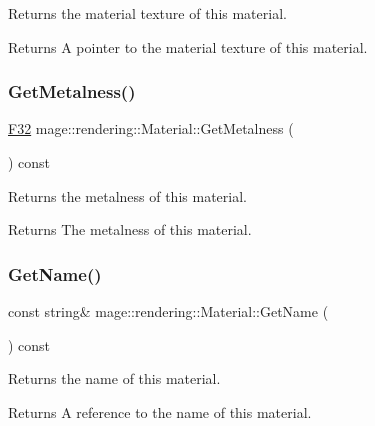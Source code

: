 Returns the material texture of this material.

\begin{DoxyReturn}{Returns}
A pointer to the material texture of this material. 
\end{DoxyReturn}
\hypertarget{classmage_1_1rendering_1_1_material_aaa4265533437b462e2f2087cfa37e623}{}\label{classmage_1_1rendering_1_1_material_aaa4265533437b462e2f2087cfa37e623} 
\subsubsection{\texorpdfstring{Get\+Metalness()}{GetMetalness()}}
{\footnotesize\ttfamily \hyperlink{namespacemage_aa97e833b45f06d60a0a9c4fc22ae02c0}{F32} mage\+::rendering\+::\+Material\+::\+Get\+Metalness (\begin{DoxyParamCaption}{ }\end{DoxyParamCaption}) const\hspace{0.3cm}{\ttfamily [noexcept]}}

Returns the metalness of this material.

\begin{DoxyReturn}{Returns}
The metalness of this material. 
\end{DoxyReturn}
\hypertarget{classmage_1_1rendering_1_1_material_ab94089dbe7d1b242fad455e9c233a78c}{}\label{classmage_1_1rendering_1_1_material_ab94089dbe7d1b242fad455e9c233a78c} 
\subsubsection{\texorpdfstring{Get\+Name()}{GetName()}}
{\footnotesize\ttfamily const string\& mage\+::rendering\+::\+Material\+::\+Get\+Name (\begin{DoxyParamCaption}{ }\end{DoxyParamCaption}) const\hspace{0.3cm}{\ttfamily [noexcept]}}

Returns the name of this material.

\begin{DoxyReturn}{Returns}
A reference to the name of this material. 
\end{DoxyReturn}
\hypertarget{classmage_1_1rendering_1_1_material_a8617392cee8e8609671be3f4147a5934}{}\label{classmage_1_1rendering_1_1_material_a8617392cee8e8609671be3f4147a5934} 
